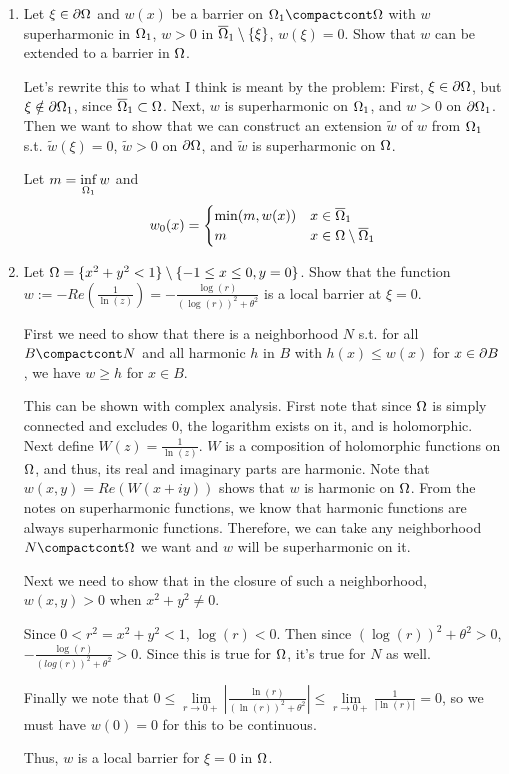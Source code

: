 \begin{enumerate}
\item
  Let $\xi \in \partial \Omega$ and $w(x)$ be a barrier on $\domain_1 \compactcont \domain$ with $w$ superharmonic in $\Omega_1$, $w > 0$
  in $\overline{\Omega}_1 \setminus \{ \xi \}$, $w(\xi) = 0$.
  Show that $w$ can be extended to a barrier in $\Omega$.

  Let's rewrite this to what I think is meant by the problem:
  First, $\xi \in \partial \Omega$, but $\xi \notin \partial \Omega_1$, since $\overline{\Omega}_1 \subset \Omega$.
  Next, $w$ is superharmonic on $\Omega_1$, and $w > 0$ on $\partial \Omega_1$.
  Then we want to show that we can construct an extension $\tilde{w}$ of $w$ from $\Omega_1$ s.t.
  $\tilde{w}(\xi) = 0$, $\tilde{w} > 0$ on $\partial \Omega$, and $\tilde{w}$ is superharmonic on $\Omega$.

  Let $m = \inf \limits_{\Omega_1} w$ and
  $$
  w_0(x) =
  \begin{cases}
    \min(m, w(x)) & x \in \overline{\Omega}_1\\
    m & x \in \Omega \setminus \overline{\Omega}_1
  \end{cases}
  $$

\item
  Let $\Omega = \{ x^2 + y^2 < 1 \} \setminus \{ -1 \leq x \leq 0, y = 0 \}$.
  Show that the function $w := -Re\left( \frac{1}{\ln(z)} \right) = - \frac{\log(r)}{(\log(r))^2 + \theta^2}$ is a local barrier at $\xi = 0$.

  First we need to show that there is a neighborhood $N$ s.t.
  for all $B \compactcont N$ and all harmonic $h$ in $B$ with $h(x) \leq w(x)$ for $x \in \partial B$,
  we have $w \geq h$ for $x \in B$.

  This can be shown with complex analysis.
  First note that since $\Omega$ is simply connected and excludes $0$, the logarithm exists on it, and is holomorphic.
  Next define $W(z) = \frac{1}{\ln(z)}$.
  $W$ is a composition of holomorphic functions on $\Omega$, and thus, its real and imaginary parts are harmonic.
  Note that $w(x, y) = Re(W(x + i y))$ shows that $w$ is harmonic on $\Omega$.
  From the notes on superharmonic functions, we know that harmonic functions are always superharmonic functions.
  Therefore, we can take any neighborhood $N \compactcont \domain$ we want and $w$ will be superharmonic on it.

  Next we need to show that in the closure of such a neighborhood, $w(x, y) > 0$ when $x^2 + y^2 \neq 0$.

  Since $0 < r^2 = x^2 + y^2 < 1$, $\log \left( r \right) < 0$.
  Then since $(\log(r))^2 + \theta^2 > 0$, $-\frac{\log(r)}{(log(r))^2 + \theta^2} > 0$.
  Since this is true for $\Omega$, it's true for $N$ as well.

  Finally we note that $0 \leq \lim \limits_{r \rightarrow 0+} \left| \frac{\ln(r)}{(\ln(r))^2 + \theta^2} \right| \leq \lim \limits_{r \rightarrow 0+} \frac{1}{|\ln(r)|} = 0$,
  so we must have $w(0) = 0$ for this to be continuous.

  Thus, $w$ is a local barrier for $\xi = 0$ in $\Omega$.
\end{enumerate}
